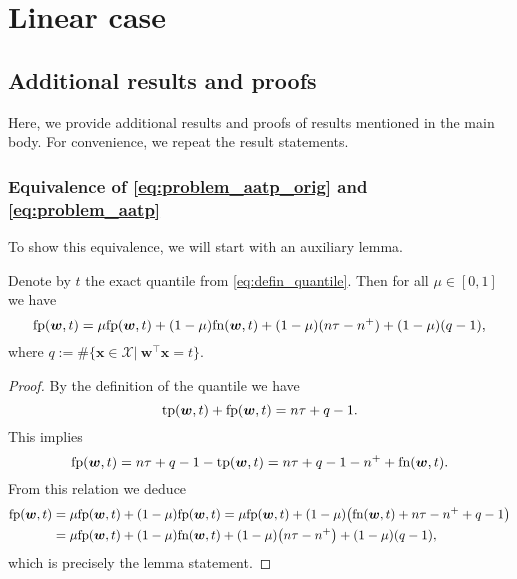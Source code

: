 \chapter{Linear case}

\section{Additional results and proofs}\label{app:proofs}

Here, we provide additional results and proofs of results mentioned in the main body. For convenience, we repeat the result statements.

\subsection{Equivalence of \eqref{eq:problem_aatp_orig} and \eqref{eq:problem_aatp}}

To show this equivalence, we will start with an auxiliary lemma.

\begin{lemma}\label{lemma:fnfp_equivalence}
  Denote by $t$ the exact quantile from \eqref{eq:defin_quantile}. Then for all $\mu\in[0,1]$ we have
  \begin{equation}\label{eq:fnfp_equivalence}
  \textnormal{fp} (\bm{w},t) = \mu \textnormal{fp}(\bm{w},t) + (1-\mu)\textnormal{fn}(\bm{w},t) + (1-\mu)(n\tau - n^+) + (1-\mu)(q - 1),
  \end{equation}
  where $q:= \#\{\bm{x} \in\mathcal X|\ \bm{w}^\top \bm{x}= t\}$.
\end{lemma}

\begin{proof}
  By the definition of the quantile we have
  \begin{equation*}
    \textnormal{tp}(\bm{w},t)+\textnormal{fp}(\bm{w},t) = n\tau + q-1.
  \end{equation*}
  This implies
  \begin{equation*}
    \textnormal{fp}(\bm{w},t)=n\tau +q - 1-\textnormal{tp}(\bm{w},t) =n\tau+q-1-n^{+} +\textnormal{fn}(\bm{w},t).
  \end{equation*}
  From this relation we deduce
  \begin{equation*}
    \begin{aligned}
      \fp(\bm{w},t) &= \mu \fp(\bm{w},t) + (1-\mu)\fp(\bm{w},t) = \mu \fp(\bm{w},t) + (1-\mu)\left(\fn(\bm{w},t) + n\tau - n^+ + q - 1\right)\\
      &= \mu \fp(\bm{w},t) + (1-\mu)\fn(\bm{w},t) + (1-\mu)\left(n\tau - n^+\right) + (1-\mu)\left(q - 1\right),
    \end{aligned}
  \end{equation*}
  which is precisely the lemma statement.
\end{proof}

